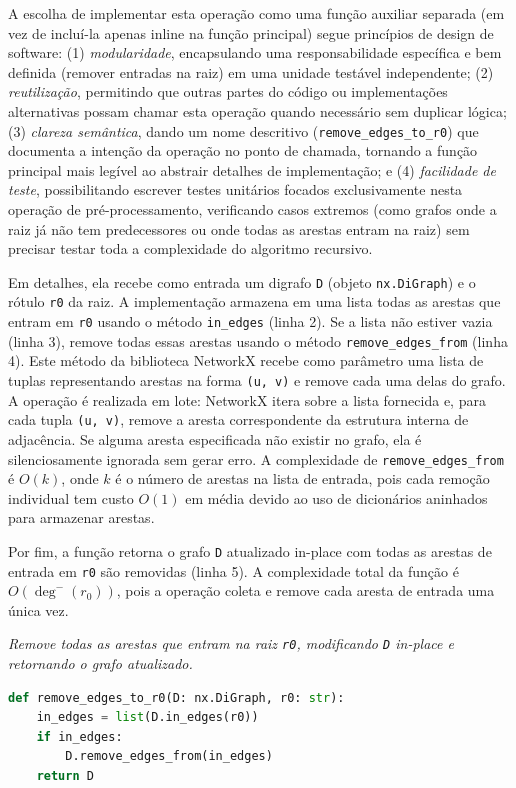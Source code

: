 A escolha de implementar esta operação como uma função auxiliar separada (em vez de incluí-la apenas inline na função principal) segue princípios de design de software: (1) \emph{modularidade}, encapsulando uma responsabilidade específica e bem definida (remover entradas na raiz) em uma unidade testável independente; (2) \emph{reutilização}, permitindo que outras partes do código ou implementações alternativas possam chamar esta operação quando necessário sem duplicar lógica; (3) \emph{clareza semântica}, dando um nome descritivo (\texttt{remove\_edges\_to\_r0}) que documenta a intenção da operação no ponto de chamada, tornando a função principal mais legível ao abstrair detalhes de implementação; e (4) \emph{facilidade de teste}, possibilitando escrever testes unitários focados exclusivamente nesta operação de pré-processamento, verificando casos extremos (como grafos onde a raiz já não tem predecessores ou onde todas as arestas entram na raiz) sem precisar testar toda a complexidade do algoritmo recursivo.

Em detalhes, ela recebe como entrada um digrafo \texttt{D} (objeto \texttt{nx.DiGraph}) e o rótulo \texttt{r0} da raiz. A implementação armazena em uma lista todas as arestas que entram em \texttt{r0} usando o método \texttt{in\_edges} (linha 2). Se a lista não estiver vazia (linha 3), remove todas essas arestas usando o método \texttt{remove\_edges\_from} (linha 4). Este método da biblioteca NetworkX recebe como parâmetro uma lista de tuplas representando arestas na forma \texttt{(u, v)} e remove cada uma delas do grafo. A operação é realizada em lote: NetworkX itera sobre a lista fornecida e, para cada tupla \texttt{(u, v)}, remove a aresta correspondente da estrutura interna de adjacência. Se alguma aresta especificada não existir no grafo, ela é silenciosamente ignorada sem gerar erro. A complexidade de \texttt{remove\_edges\_from} é \(O(k)\), onde \(k\) é o número de arestas na lista de entrada, pois cada remoção individual tem custo \(O(1)\) em média devido ao uso de dicionários aninhados para armazenar arestas.

Por fim, a função retorna o grafo \texttt{D} atualizado in-place com todas as arestas de entrada em \texttt{r0} são removidas (linha 5). A complexidade total da função é \(O(\deg^-(r_0))\), pois a operação coleta e remove cada aresta de entrada uma única vez.

\begin{tcolorbox}[
        enhanced, breakable,
        colframe=blue!60!black, colback=blue!2,
        colbacktitle=blue!15, coltitle=black,
        title={Remoção de arestas que entram na raiz},
        boxed title style={sharp corners, boxrule=0.6pt},
        sharp corners, boxrule=0.6pt
    ]
    \emph{Remove todas as arestas que entram na raiz \texttt{r0}, modificando \texttt{D} in-place e retornando o grafo atualizado.}
    \tcblower
    \begin{lstlisting}[mathescape=true, language=Python]
def remove_edges_to_r0(D: nx.DiGraph, r0: str):
    in_edges = list(D.in_edges(r0))
    if in_edges:
        D.remove_edges_from(in_edges)
    return D
\end{lstlisting}
\end{tcolorbox}


